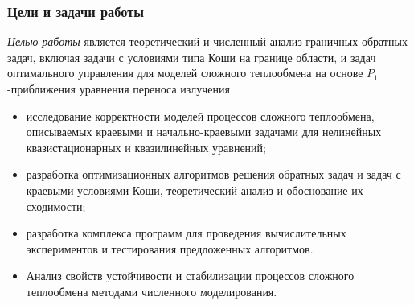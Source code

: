 \begin{frame}
    \frametitle{Цели и задачи работы}
    \textit{Целью работы} является теоретический и численный анализ граничных обратных задач, включая
    задачи с условиями типа Коши на границе области, и задач оптимального
    управления для моделей сложного теплообмена на основе $P_1$-приближения
    уравнения переноса излучения


    \begin{itemize}
        \item исследование корректности моделей процессов сложного теплообмена,
        описываемых краевыми и начально-краевыми задачами для нелинейных
        квазистационарных и квазилинейных уравнений;
        \item разработка оптимизационных алгоритмов решения обратных задач и
        задач с краевыми условиями Коши, теоретический анализ и обоснование их сходимости;
        \item разработка комплекса программ для проведения вычислительных
        экспериментов и тестирования предложенных алгоритмов.
        \item Анализ свойств устойчивости и стабилизации
        процессов сложного теплообмена методами численного моделирования.
    \end{itemize}
\end{frame}

